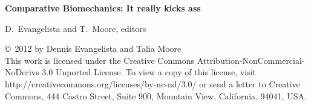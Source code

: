 

\clearpage
\thispagestyle{empty}
\begin{flushleft}
\vspace*{3in}
\textbf{\Huge Comparative Biomechanics: It really kicks ass}

\medskip
{\large D.\ Evangelista and T.\ Moore, editors}
\vspace{2in}

{\footnotesize\copyright\ 2012 by Dennis Evangelista and Talia Moore\\
\medskip
This work is licensed under the Creative Commons Attribution-NonCommercial-NoDerivs 3.0 Unported License. To view a copy of this license, visit http://creativecommons.org/licenses/by-nc-nd/3.0/ or send a letter to Creative Commons, 444 Castro Street, Suite 900, Mountain View, California, 94041, USA.}
\end{flushleft}

